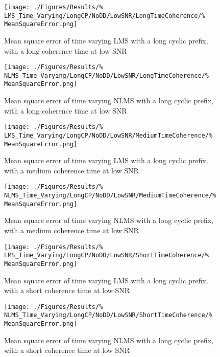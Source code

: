 \begin{figure}[ht]
	\centering
	\begin{minipage}{0.49\textwidth}
		\centering
		\texttt{[image: ./Figures/Results/\%
	LMS\_Time\_Varying/LongCP/NoDD/LowSNR/LongTimeCoherence/\%
	MeanSquareError.png]}
		\caption{Mean square error of time varying LMS with a 
		long cyclic prefix, with a long coherence time at 
		low SNR}
	\end{minipage}
	\begin{minipage}{0.49\textwidth}
		\centering
		\texttt{[image: ./Figures/Results/\%
	NLMS\_Time\_Varying/LongCP/NoDD/LowSNR/LongTimeCoherence/\%
	MeanSquareError.png]}
		\caption{Mean square error of time varying NLMS with 
		a long cyclic prefix, with a long coherence time 
		at low SNR}
		\label{fig:NLMS-Long-Low-None-Long}
	\end{minipage}
\end{figure}

\begin{figure}[ht]
	\centering
	\begin{minipage}{0.49\textwidth}
		\centering
		\texttt{[image: ./Figures/Results/\%
	LMS\_Time\_Varying/LongCP/NoDD/LowSNR/MediumTimeCoherence/\%
	MeanSquareError.png]}
		\caption{Mean square error of time varying LMS with a 
		long cyclic prefix, with a medium coherence time at 
		low SNR}
	\end{minipage}
	\begin{minipage}{0.49\textwidth}
		\centering
		\texttt{[image: ./Figures/Results/\%
	NLMS\_Time\_Varying/LongCP/NoDD/LowSNR/MediumTimeCoherence/\%
	MeanSquareError.png]}
		\caption{Mean square error of time varying NLMS with 
		a long cyclic prefix, with a medium coherence time 
		at low SNR}
	\end{minipage}
\end{figure}

\begin{figure}[ht]
	\centering
	\begin{minipage}{0.49\textwidth}
		\centering
		\texttt{[image: ./Figures/Results/\%
	LMS\_Time\_Varying/LongCP/NoDD/LowSNR/ShortTimeCoherence/\%
	MeanSquareError.png]}
		\caption{Mean square error of time varying LMS with a 
		long cyclic prefix, with a short coherence time at 
		low SNR}
	\end{minipage}
	\begin{minipage}{0.49\textwidth}
		\centering
		\texttt{[image: ./Figures/Results/\%
	NLMS\_Time\_Varying/LongCP/NoDD/LowSNR/ShortTimeCoherence/\%
	MeanSquareError.png]}
		\caption{Mean square error of time varying NLMS with 
		a long cyclic prefix, with a short coherence time at 
		low SNR}
	\end{minipage}
\end{figure}

